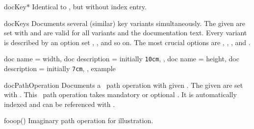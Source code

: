 \begin{docEnvironment}[doclang/environment content=key description,doc updated=2020-04-22]
    {docKey*}{}
  Identical to , but without index entry.
\end{docEnvironment}


\begin{docEnvironment}[doclang/environment content=key description,doc new=2020-04-22]
    {docKeys}{}
  Documents several (similar) key variants simultaneously.
  The given  are set with  and are valid for
  all variants and the documentation text.
  Every variant is described by an option set , , and so on.
  The most crucial options are
  , , ,
  and .
\begin{dispExample}
\begin{docKeys}[
    doc no index,   %
    doc keypath   = mykeyroot,
    doc parameter = {=\meta{length}},
  ]
  {
    {
      doc name        = width,
      doc description = initially \texttt{10cm},
    },
    {
      doc name        = height,
      doc description = initially \texttt{7cm},
    },
  }
  example
\end{docKeys}
\end{dispExample}
\end{docEnvironment}


\clearpage
\begin{docEnvironment}[doclang/environment content=operation description,
    doc new and updated={2019-09-18}{2020-04-22}]{docPathOperation}{}
  Documents a \tikzname\ path operation with given .
  The given  are set with .
  This \tikzname\ path operation takes mandatory or optional .
  It is automatically indexed and can be referenced with
  .
\begin{dispExample}
\begin{docPathOperation}{fooop}{()}
  Imaginary path operation for illustration.
\end{docPathOperation}
\end{dispExample}
\end{docEnvironment}


